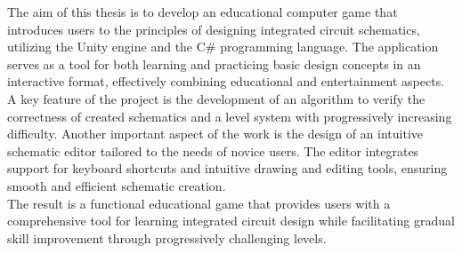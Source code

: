 The aim of this thesis is to develop an educational computer game
that introduces users to the principles of designing integrated circuit schematics,
utilizing the Unity engine and the C\# programming language.
The application serves as a tool for both learning and practicing basic design concepts in an interactive format,
effectively combining educational and entertainment aspects.\\
\indent A key feature of the project is the development of an algorithm to verify the correctness of created schematics
and a level system with progressively increasing difficulty.
Another important aspect of the work is the design of an intuitive schematic editor tailored to the needs of novice users.
The editor integrates support for keyboard shortcuts and intuitive drawing and editing tools,
ensuring smooth and efficient schematic creation.\\
\indent The result is a functional educational game that provides users with a comprehensive tool
for learning integrated circuit design while
facilitating gradual skill improvement through progressively challenging levels.
